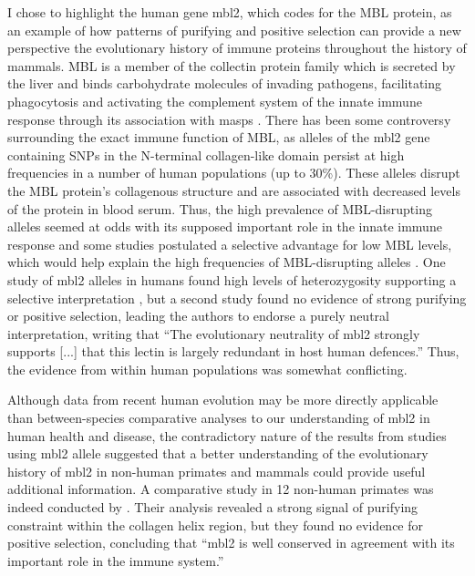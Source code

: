 I chose to highlight the human gene \ac{mbl2}, which codes for the MBL
protein, as an example of how \sw patterns of purifying and positive
selection can provide a new perspective the evolutionary history of
immune proteins throughout the history of mammals. MBL is a member of
the collectin protein family which is secreted by the liver and binds
carbohydrate molecules of invading pathogens, facilitating
phagocytosis and activating the complement system of the innate immune
response through its association with \acp{masp}
\citep{Seyfarth2005}. There has been some controversy surrounding the
exact immune function of MBL, as alleles of the \ac{mbl2} gene
containing SNPs in the N-terminal collagen-like domain persist at high
frequencies in a number of human populations (up to 30\%). These
alleles disrupt the MBL protein's collagenous structure and are
associated with decreased levels of the protein in blood serum. Thus,
the high prevalence of MBL-disrupting alleles seemed at odds with its
supposed important role in the innate immune response
\citep{Seyfarth2005} and some studies postulated a selective advantage
for low MBL levels, which would help explain the high frequencies of
MBL-disrupting alleles \citep{Garred2006}. One study of \ac{mbl2}
alleles in humans found high levels of heterozygosity supporting a
selective interpretation \citep{Bernig2004}, but a second study
\citep{Verdu2006} found no evidence of strong purifying or positive
selection, leading the authors to endorse a purely neutral
interpretation, writing that ``The evolutionary neutrality of \ac{mbl2}
strongly supports [...]  that this lectin is largely redundant in host
human defences.'' Thus, the evidence from within human populations was
somewhat conflicting.

Although data from recent human evolution may be more directly
applicable than between-species comparative analyses to our
understanding of \ac{mbl2} in human health and disease, the
contradictory nature of the results from studies using \ac{mbl2}
allele suggested that a better understanding of the evolutionary
history of \ac{mbl2} in non-human primates and mammals could provide
useful additional information. A comparative study in 12 non-human
primates was indeed conducted by \citet{Falzacappa2004}. Their
analysis revealed a strong signal of purifying constraint within the
collagen helix region, but they found no evidence for positive
selection, concluding that ``\ac{mbl2} is well conserved in agreement with
its important role in the immune system.''

